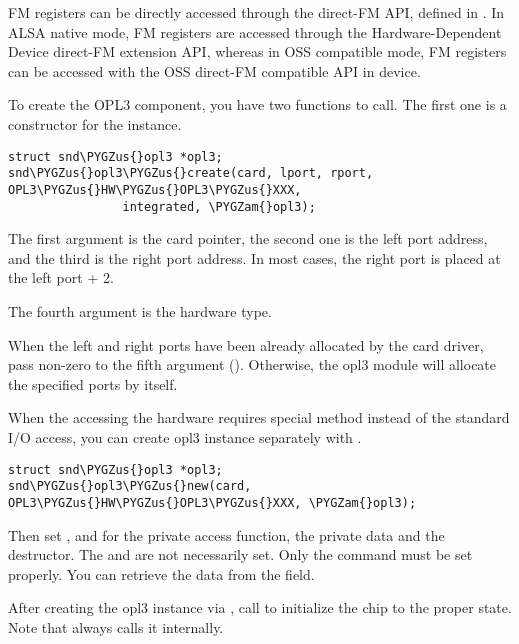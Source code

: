 \documentclass[a4paper,8pt,english]{sphinxmanual}
\def\PYGZus{\char`\_}
\def\PYGZam{\char`\&}
\begin{document}
FM registers can be directly accessed through the direct-FM API, defined
in . In ALSA native mode, FM registers are
accessed through the Hardware-Dependent Device direct-FM extension API,
whereas in OSS compatible mode, FM registers can be accessed with the
OSS direct-FM compatible API in  device.

To create the OPL3 component, you have two functions to call. The first
one is a constructor for the  instance.

\begin{Verbatim}[commandchars=\\\{\}]
struct snd\PYGZus{}opl3 *opl3;
snd\PYGZus{}opl3\PYGZus{}create(card, lport, rport, OPL3\PYGZus{}HW\PYGZus{}OPL3\PYGZus{}XXX,
                integrated, \PYGZam{}opl3);
\end{Verbatim}

The first argument is the card pointer, the second one is the left port
address, and the third is the right port address. In most cases, the
right port is placed at the left port + 2.

The fourth argument is the hardware type.

When the left and right ports have been already allocated by the card
driver, pass non-zero to the fifth argument (). Otherwise,
the opl3 module will allocate the specified ports by itself.

When the accessing the hardware requires special method instead of the
standard I/O access, you can create opl3 instance separately with
.

\begin{Verbatim}[commandchars=\\\{\}]
struct snd\PYGZus{}opl3 *opl3;
snd\PYGZus{}opl3\PYGZus{}new(card, OPL3\PYGZus{}HW\PYGZus{}OPL3\PYGZus{}XXX, \PYGZam{}opl3);
\end{Verbatim}

Then set ,  and  for the
private access function, the private data and the destructor. The
 and  are not necessarily set. Only the command
must be set properly. You can retrieve the data from the
 field.

After creating the opl3 instance via ,
call  to initialize the chip to the
proper state. Note that  always calls
it internally.
\end{document}
